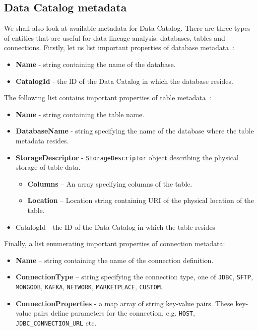 \subsection{Data Catalog metadata}
We shall also look at available metadata for Data Catalog. There are three types of entities that are useful for data lineage analysis: databases, tables and connections. Firstly, let us list important properties of database metadata~\cite{gluedatabase}:
\begin{itemize}
    \item \textbf{Name} - string containing the name of the database.
    \item \textbf{CatalogId} - the ID of the Data Catalog in which the database resides.
\end{itemize}
\par
The following list contains important properties of table metadata~\cite{gluetable}:
\begin{itemize}
    \item \textbf{Name} - string containing the table name.
    \item \textbf{DatabaseName}  - string specifying the name of the database where the table metadata resides.
    \item \textbf{StorageDescriptor} - \texttt{StorageDescriptor} object describing the physical storage of table data.
    \begin{itemize}
        \item \textbf{Columns} – An array specifying columns of the table.
        \item \textbf{Location} – Location string containing URI of the physical location of the table.
    \end{itemize}
    \item CatalogId - the ID of the Data Catalog in which the table resides 
\end{itemize}
\par
Finally, a list enumerating important properties of connection metadata:
\begin{itemize}
    \item \textbf{Name} – string containing the name of the connection definition.
    \item \textbf{ConnectionType} – string specifying the connection type, one of \texttt{JDBC}, \texttt{SFTP}, \texttt{MONGODB}, \texttt{KAFKA}, \texttt{NETWORK}, \texttt{MARKETPLACE}, \texttt{CUSTOM}.
    \item \textbf{ConnectionProperties} - a map array of string key-value pairs. These key-value pairs define parameters for the connection, e.g. \texttt{HOST}, \texttt{JDBC\_CONNECTION\_URL} etc.
\end{itemize}
